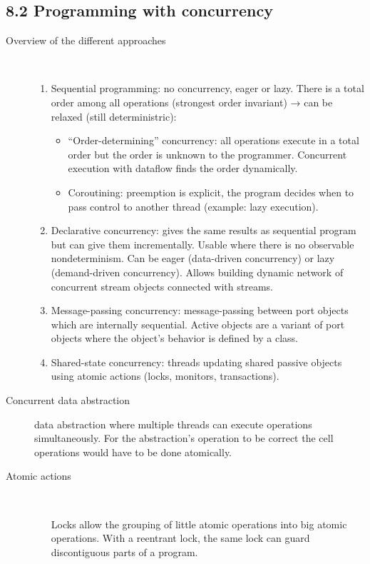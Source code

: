 \subsection{8.2 Programming with concurrency}
\begin{description}
  \item[Overview of the different approaches]~
    \begin{enumerate}
      \item Sequential programming: no concurrency, eager or lazy.
        There is a total order among all operations (strongest order invariant) → can be relaxed (still deterministric):
        \begin{itemize}
          \item ``Order-determining'' concurrency: all operations execute in a total order but the order is unknown to the programmer.
            Concurrent execution with dataflow finds the order dynamically.
          \item Coroutining: preemption is explicit, the program decides when to pass control to another thread (example: lazy execution).
        \end{itemize}
      \item Declarative concurrency: gives the same results as sequential program but can give them incrementally.
        Usable where there is no observable nondeterminism.
        Can be eager (data-driven concurrency) or lazy (demand-driven concurrency).
        Allows building dynamic network of concurrent stream objects connected with streams.
      \item Message-passing concurrency: message-passing between port objects which are internally sequential.
        Active objects are a variant of port objects where the object's behavior is defined by a class.
      \item Shared-state concurrency: threads updating shared passive objects using atomic actions (locks, monitors, transactions).
    \end{enumerate}
  \item[Concurrent data abstraction] data abstraction where multiple threads can execute operations simultaneously.
    For the abstraction's operation to be correct the cell operations would have to be done atomically.
  \item[Atomic actions]~
    \begin{enumerate}
      \item[Locks] allow the grouping of little atomic operations into big atomic operations.
        With a reentrant lock, the same lock can guard discontiguous parts of a program.

\end{enumerate}
\end{description}

